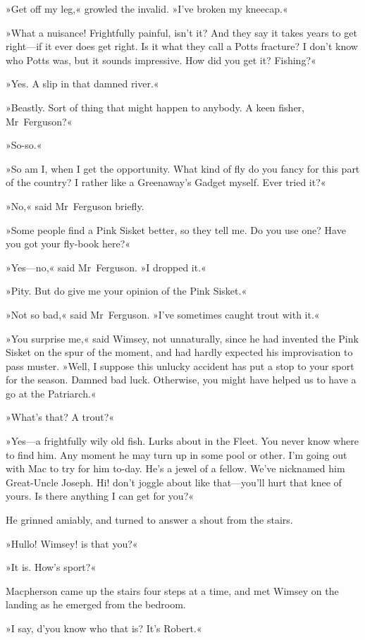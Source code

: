 »Get off my leg,« growled the invalid. »I've broken my kneecap.«

»What a nuisance! Frightfully painful, isn't it? And they say it takes years to get right—if it ever does get right. Is it what they call a Potts fracture? I don't know who Potts was, but it sounds impressive. How did you get it? Fishing?«

»Yes. A slip in that damned river.«

»Beastly. Sort of thing that might happen to anybody. A keen fisher, Mr~Ferguson?«

»So-so.«

»So am I, when I get the opportunity. What kind of fly do you fancy for this part of the country? I rather like a Greenaway's Gadget myself. Ever tried it?«

»No,« said Mr~Ferguson briefly.

»Some people find a Pink Sisket better, so they tell me. Do you use one? Have you got your fly-book here?«

»Yes—no,« said Mr~Ferguson. »I dropped it.«

»Pity. But do give me your opinion of the Pink Sisket.«

»Not so bad,« said Mr~Ferguson. »I've sometimes caught trout with it.«

»You surprise me,« said Wimsey, not unnaturally, since he had invented the Pink Sisket on the spur of the moment, and had hardly expected his improvisation to pass muster. »Well, I suppose this unlucky accident has put a stop to your sport for the season. Damned bad luck. Otherwise, you might have helped us to have a go at the Patriarch.«

»What's that? A trout?«

»Yes—a frightfully wily old fish. Lurks about in the Fleet. You never know where to find him. Any moment he may turn up in some pool or other. I'm going out with Mac to try for him to-day. He's a jewel of a fellow. We've nicknamed him Great-Uncle Joseph. Hi! don't joggle about like that—you'll hurt that knee of yours. Is there anything I can get for you?«

He grinned amiably, and turned to answer a shout from the stairs.

»Hullo! Wimsey! is that you?«

»It is. How's sport?«

Macpherson came up the stairs four steps at a time, and met Wimsey on the landing as he emerged from the bedroom.

»I say, d'you know who that is? It's Robert.«

